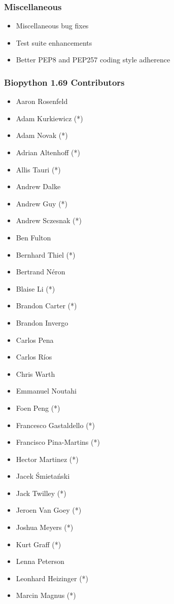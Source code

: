\documentclass[trans]{beamer}
\begin{document}
\frame
{
  \frametitle{Miscellaneous}

  \begin{itemize}
  \item Miscellaneous bug fixes
  \item Test suite enhancements
  \item Better PEP8 and PEP257 coding style adherence
  \end{itemize}
}

\frame
{
  \frametitle{Biopython 1.69 Contributors}

  \scriptsize{
  \begin{multicols}{2}
  \begin{itemize}
  \item Aaron Rosenfeld
  \item Adam Kurkiewicz (*)
  \item Adam Novak (*)
  \item Adrian Altenhoff (*)
  \item Allis Tauri (*)
  \item Andrew Dalke
  \item Andrew Guy (*)
  \item Andrew Sczesnak (*)
  \item Ben Fulton
  \item Bernhard Thiel (*)
  \item Bertrand Néron
  \item Blaise Li (*)
  \item Brandon Carter (*)
  \item Brandon Invergo
  \item Carlos Pena
  \item Carlos Ríos
  \item Chris Warth
  \item Emmanuel Noutahi
  \item Foen Peng (*)
  \item Francesco Gastaldello (*)
  \item Francisco Pina-Martins (*)
  \item Hector Martinez (*)
  \item Jacek Śmietański
  \item Jack Twilley (*)
  \item Jeroen Van Goey (*)
  \item Joshua Meyers (*)
  \item Kurt Graff (*)
  \item Lenna Peterson
  \item Leonhard Heizinger (*)
  \item Marcin Magnus (*)

\end{itemize}
\end{multicols}}}
\end{document}
